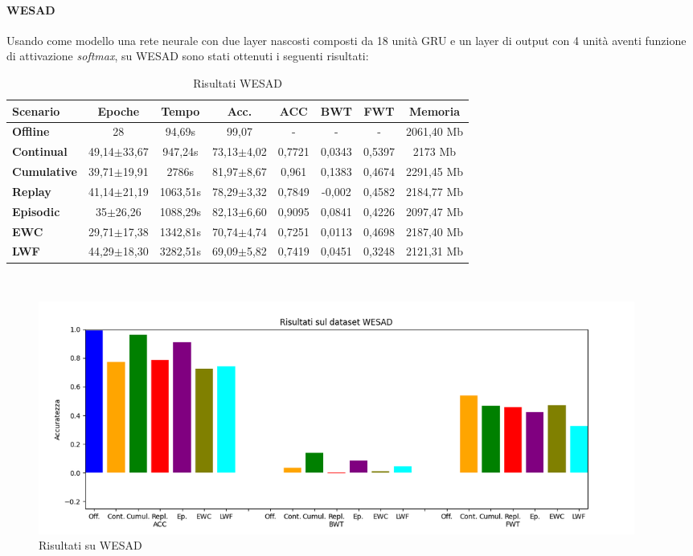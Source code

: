 \paragraph{WESAD} Usando come modello una rete neurale con due layer nascosti composti da 18 unità GRU e un layer di output con 4 unità aventi funzione di attivazione \textit{softmax}, su WESAD sono stati ottenuti i seguenti risultati:
\begin{table}[h]
\footnotesize
    \begin{tabular}{l|c|c|c|c|c|c|c}
        \textbf{Scenario} & \textbf{Epoche} & \textbf{Tempo} & \textbf{Acc.} & \textbf{ACC} & \textbf{BWT} & \textbf{FWT} & \textbf{Memoria}\\
        \hline
        \textbf{Offline} & 28 & 94,69s & 99,07 & - & - & - & 2061,40 Mb\\
        \textbf{Continual} & 49,14$\pm$33,67 & 947,24s & 73,13$\pm$4,02 & 0,7721 & 0,0343 & 0,5397 & 2173 Mb\\
        \textbf{Cumulative} & 39,71$\pm$19,91 & 2786s & 81,97$\pm$8,67 & 0,961 & 0,1383 & 0,4674 & 2291,45 Mb\\
        \textbf{Replay} & 41,14$\pm$21,19 & 1063,51s & 78,29$\pm$3,32 & 0,7849 & -0,002 & 0,4582 & 2184,77 Mb\\
        \textbf{Episodic} & 35$\pm$26,26 & 1088,29s & 82,13$\pm$6,60 & 0,9095 & 0,0841 & 0,4226 & 2097,47 Mb\\
        \textbf{EWC} & 29,71$\pm$17,38 & 1342,81s & 70,74$\pm$4,74 & 0,7251 & 0,0113 & 0,4698 & 2187,40 Mb\\
        \textbf{LWF} & 44,29$\pm$18,30 & 3282,51s & 69,09$\pm$5,82 & 0,7419 & 0,0451 & 0,3248 & 2121,31 Mb\\
    \end{tabular}
    \caption{Risultati WESAD}
    \label{tab:reswesad}
\end{table}\\
\begin{figure}[h]
	\begin{center}
		\includegraphics[width=0.95\textwidth]{img/graphs/wesad_final_metrics.png}
		\caption{Risultati su WESAD}
		\label{fig:wesad_metrics_graph}
	\end{center}
\end{figure}\\
